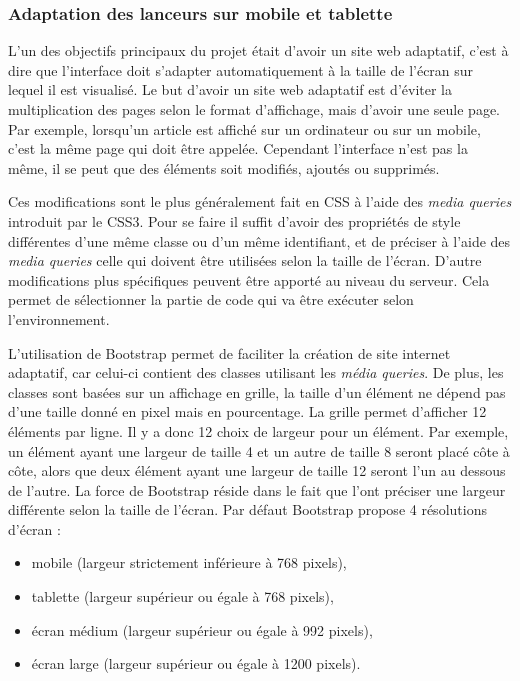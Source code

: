 \documentclass[12pt,a4paper]{article}
\begin{document}
\subsubsection{Adaptation des lanceurs sur mobile et tablette}
L'un des objectifs principaux du projet était d'avoir un site web adaptatif, c'est à dire que l'interface doit s'adapter automatiquement à la taille de l'écran sur lequel il est visualisé. Le but d'avoir un site web adaptatif est d'éviter la multiplication des pages selon le format d'affichage, mais d'avoir une seule page. Par exemple, lorsqu'un article est affiché sur un ordinateur ou sur un mobile, c'est la même page qui doit être appelée. Cependant l'interface n'est pas la même, il se peut que des éléments soit modifiés, ajoutés ou supprimés.\par 
Ces modifications sont le plus généralement fait en CSS à l'aide des \textit{media queries} introduit par le CSS3. Pour se faire il suffit d'avoir des propriétés de style différentes d'une même classe ou d'un même identifiant, et de préciser à l'aide des \textit{media queries} celle qui doivent être utilisées selon la taille de l'écran. D'autre modifications plus spécifiques peuvent être apporté au niveau du serveur. Cela permet de sélectionner la partie de code qui va être exécuter selon l'environnement.\par
\medskip
L'utilisation de Bootstrap permet de faciliter la création de site internet adaptatif, car celui-ci contient des classes utilisant les \textit{média queries}. De plus, les classes sont basées sur un affichage en grille, la taille d'un élément ne dépend pas d'une taille donné en pixel mais en pourcentage. La grille permet d'afficher 12 éléments par ligne. Il y a donc 12 choix de largeur pour un élément. Par exemple, un élément ayant une largeur de taille 4 et un autre de taille 8 seront placé côte à côte, alors que deux élément ayant une largeur de taille 12 seront l'un au dessous de l'autre. La force de Bootstrap réside dans le fait que l'ont préciser une largeur différente selon la taille de l'écran. Par défaut Bootstrap propose 4 résolutions d'écran :
\begin{itemize}
\item mobile (largeur strictement inférieure à 768 pixels),
\item tablette (largeur supérieur ou égale à 768 pixels),
\item écran médium (largeur supérieur ou égale à 992 pixels),
\item écran large (largeur supérieur ou égale à 1200 pixels).
\end{itemize}
\end{document}
